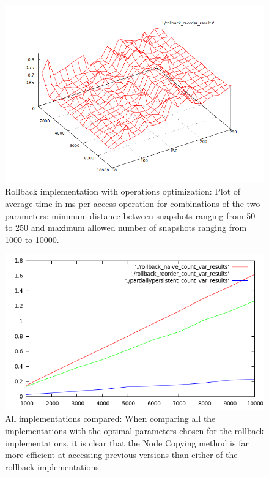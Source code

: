 \begin{figure}[!hbp]
    \includegraphics[width=\textwidth]{figures/rollback_reorder_results_plot.png}
    \caption{Rollback implementation with operations optimization: Plot of
    average time in ms per access operation for combinations of the two
    parameters: minimum distance between snapshots ranging from 50 to 250 and
    maximum allowed number of snapshots ranging from 1000 to 10000.}
    \label{fig:rollback_reorder_results_plot.png}
\end{figure}

\begin{figure}[!hbp]
    \includegraphics[width=\textwidth]{figures/rollback_results_count_var_plot.png}
    \caption{All implementations compared: When comparing all the
    implementations with the optimal parameters chosen for the rollback
    implementations, it is clear that the Node Copying method is far more
    efficient at accessing previous versions than either of the rollback
    implementations.}
    \label{fig:rollback_results_count_var_plot.png}
\end{figure}
